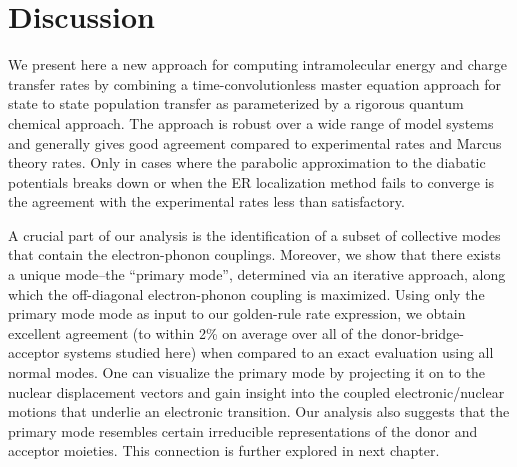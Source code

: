 \section{Discussion}

We present here a new approach for computing intramolecular energy and charge transfer rates
by combining a time-convolutionless master equation approach for state to state population transfer as parameterized
by  a rigorous quantum chemical approach.   The approach is robust over a wide range of model systems and
generally gives good agreement compared to experimental rates and Marcus theory rates.
Only in cases where the parabolic approximation to the diabatic potentials breaks down or when the ER localization method
fails to converge is the agreement with the experimental rates less than satisfactory.

A crucial part of our analysis is the identification of a subset of collective modes that contain
the electron-phonon couplings.  Moreover, we show that there exists a unique mode--the ``primary mode'',
determined via an iterative
approach, along which  the off-diagonal electron-phonon coupling is maximized.   Using only the primary mode
mode as input to our golden-rule rate expression, we obtain excellent
agreement (to within 2\% on average over   all of the donor-bridge-acceptor systems studied here)
when compared to an exact evaluation using all normal modes.   One can visualize the primary mode by projecting it on to the
nuclear displacement vectors and gain insight into the coupled electronic/nuclear motions that underlie an electronic
transition.   Our analysis also suggests that the primary  mode resembles certain  irreducible representations of the
donor and acceptor moieties. This connection is further explored in next chapter.

% 
% 






